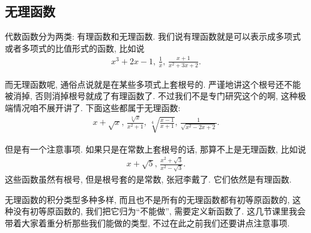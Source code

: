 \documentclass{ctexbook}
\begin{document}
{\subsection{无理函数}
代数函数分为两类: 有理函数和无理函数. 我们说有理函数就是可以表示成多项式或者多项式的比值形式的函数, 比如说
\begin{align*}
x^{3}+2x-1,\,\frac{1}{x},\,\frac{x+1}{x^{2}+3x+2}
.\end{align*}\par
而无理函数呢, 通俗点说就是在某些多项式上套根号的. 严谨地讲这个根号还不能被消掉, 否则消掉根号就成了有理函数了. 不过我们不是专门研究这个的啊, 这种极端情况咱不展开讲了. 下面这些都属于无理函数: 
\begin{align*}
x+\sqrt{x},\,\frac{\sqrt[3]{x}}{x^{2}+1},\,\sqrt[4]{\frac{x-1}{x+1}},\,\frac{1}{\sqrt{x^{2}-2x+2}}
.\end{align*}\par
但是有一个注意事项. 如果只是在常数上套根号的话, 那算不上是无理函数, 比如说
\begin{align*}
x+\sqrt{5},\,\frac{x^{2}+\sqrt{3}}{x^{2}-\sqrt{3}}
.\end{align*}
这些函数虽然有根号, 但是根号套的是常数, 张冠李戴了. 它们依然是有理函数. \par
无理函数的积分类型多种多样, 而且也不是所有的无理函数都有初等原函数的, 这种没有初等原函数的, 我们把它归为“不能做”, 需要定义新函数了. 这几节课里我会带着大家着重分析那些我们能做的类型, 不过在此之前我们还要讲点注意事项. \par
}
\end{document}
